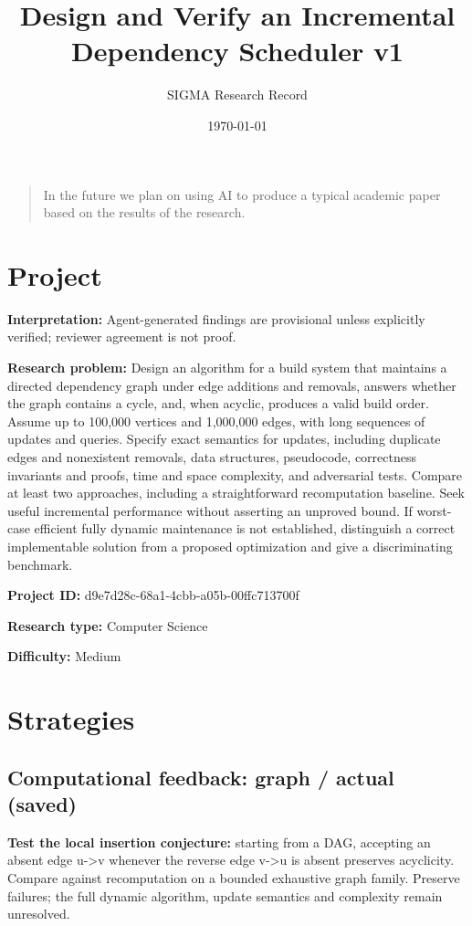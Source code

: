 \documentclass[11pt]{article}
\title{Design and Verify an Incremental Dependency Scheduler v1}
\author{SIGMA Research Record}
\date{\today}
\begin{document}
\maketitle
\begin{quote}\small In the future we plan on using AI to produce a typical academic paper based on the results of the research.\end{quote}
\section{Project}
\textbf{Interpretation:} Agent-generated findings are provisional unless explicitly verified; reviewer agreement is not proof.\par
\textbf{Research problem:} Design an algorithm for a build system that maintains a directed dependency graph under edge additions and removals, answers whether the graph contains a cycle, and, when acyclic, produces a valid build order. Assume up to 100,000 vertices and 1,000,000 edges, with long sequences of updates and queries. Specify exact semantics for updates, including duplicate edges and nonexistent removals, data structures, pseudocode, correctness invariants and proofs, time and space complexity, and adversarial tests. Compare at least two approaches, including a straightforward recomputation baseline. Seek useful incremental performance without asserting an unproved bound. If worst-case efficient fully dynamic maintenance is not established, distinguish a correct implementable solution from a proposed optimization and give a discriminating benchmark.\par
\textbf{Project ID:} d9e7d28c-68a1-4cbb-a05b-00ffc713700f\par
\textbf{Research type:} Computer Science\par
\textbf{Difficulty:} Medium\par
\section{Strategies}
\subsection{Computational feedback: graph / actual (saved)}
\textbf{Test the local insertion conjecture:} starting from a DAG, accepting an absent edge u-\textgreater{}v whenever the reverse edge v-\textgreater{}u is absent preserves acyclicity. Compare against recomputation on a bounded exhaustive graph family. Preserve failures; the full dynamic algorithm, update semantics and complexity remain unresolved.\par
\end{document}
